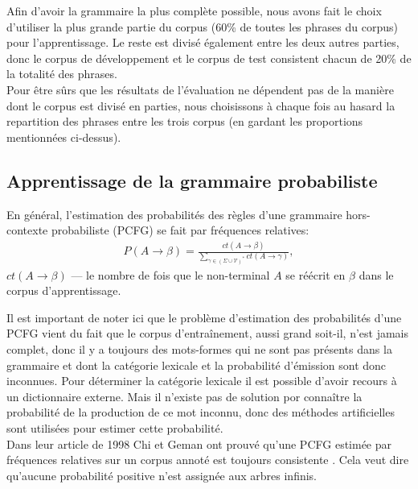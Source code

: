 \documentclass[12pt]{article}
\begin{document}
Afin d'avoir la grammaire la plus compl\`ete possible, nous avons fait le choix
d'utiliser la plus grande partie du corpus (60\% de toutes les phrases du
corpus) pour l'apprentissage. Le reste est divis\'e \'egalement entre les deux
autres parties, donc le corpus de d\'eveloppement et le corpus de test consistent
chacun de 20\% de la totalit\'e des phrases. \\

Pour \^etre sûrs que les r\'esultats de l'\'evaluation ne d\'ependent pas de la mani\`ere
dont le corpus est divis\'e en parties, nous choisissons \`a chaque fois au hasard
la repartition des phrases entre les trois corpus (en gardant les proportions mentionn\'ees
ci-dessus).


\subsection{Apprentissage de la grammaire probabiliste}

En g\'en\'eral, l'estimation des probabilit\'es des r\`egles d'une grammaire
hors-contexte probabiliste (PCFG) se fait par fr\'equences relatives:
\begin{eqnarray}
P(A \rightarrow \beta) = \frac{ct(A \rightarrow \beta)}{\sum\limits_{\gamma \in (\Sigma \cup \mathcal{V})^*}{ct(A \rightarrow \gamma)}},
\end{eqnarray}
$ct(A \rightarrow \beta)$ --- le nombre de fois que le non-terminal $A$ se
r\'e\'ecrit en $\beta$ dans le corpus d'apprentissage.

Il est important de noter ici que le probl\`eme d'estimation des probabilit\'es
d'une PCFG vient du fait que le corpus d'entra\^inement, aussi grand soit-il,
n'est jamais complet, donc il y a toujours des mots-formes qui ne sont pas
pr\'esents dans la grammaire et dont la cat\'egorie lexicale et la
probabilit\'e d'\'emission sont donc inconnues. Pour d\'eterminer la cat\'egorie
lexicale il est possible d'avoir recours \`a un dictionnaire externe. Mais il
n'existe pas de solution por conna\^itre la probabilit\'e de la production de ce
mot inconnu, donc des m\'ethodes artificielles sont utilis\'ees pour estimer
cette probabilit\'e.\\

Dans leur article de 1998 Chi et Geman ont prouv\'e qu'une PCFG estim\'ee par
fr\'equences relatives sur un corpus annot\'e est toujours consistente
\cite{proper_PCFG_estimation}. Cela veut dire qu'aucune probabilit\'e positive
n'est assign\'ee aux arbres infinis.
\end{document}
